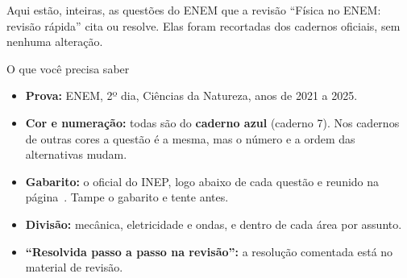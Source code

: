 \documentclass[11pt]{article}
\begin{document}
\setcounter{page}{2}
Aqui estão, inteiras, as questões do ENEM que a revisão ``Física no ENEM: revisão rápida'' cita ou resolve.
Elas foram recortadas dos cadernos oficiais, sem nenhuma alteração.

\begin{quadro}{O que você precisa saber}
\begin{itemize}
  \item \textbf{Prova:} ENEM, 2º dia, Ciências da Natureza, anos de 2021 a 2025.
  \item \textbf{Cor e numeração:} todas são do \textbf{caderno azul} (caderno 7). Nos cadernos de outras cores a questão é a mesma,
        mas o número e a ordem das alternativas mudam.
  \item \textbf{Gabarito:} o oficial do INEP, logo abaixo de cada questão e reunido na página~\pageref{pg:gab}. Tampe o gabarito e tente antes.
  \item \textbf{Divisão:} mecânica, eletricidade e ondas, e dentro de cada área por assunto.
  \item \textbf{``Resolvida passo a passo na revisão'':} a resolução comentada está no material de revisão.
\end{itemize}
\end{quadro}



\end{document}
